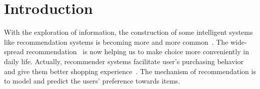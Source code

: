 \documentclass[sigconf]{acmart}
\begin{document}



\maketitle

\section{Introduction}
	With the exploration of information, the construction of some intelligent systems like recommendation systems is becoming more and more common~\cite{ricci2011introduction}. The wide-spread recommendation~\cite{xue2017deep, liu2010personalized} is now helping us to make choice more conveniently in daily life. Actually, recommender systems facilitate user's purchasing behavior and give them better shopping experience~\cite{schafer1999recommender}. The mechanism of recommendation is to model and predict the users' preference towards items.
\end{document}
